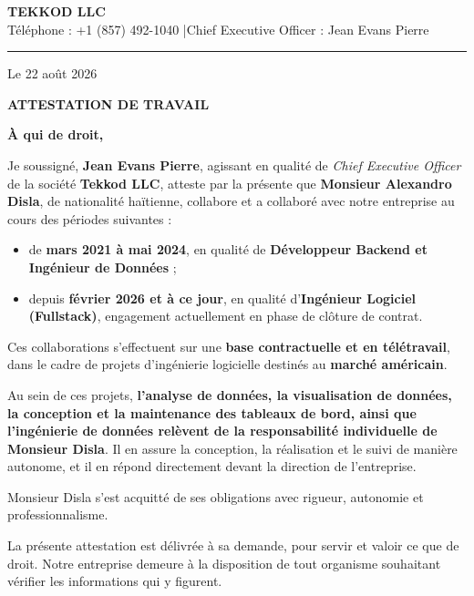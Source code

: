 \documentclass[11pt,a4paper]{article}
\begin{document}
{\Large\bfseries TEKKOD LLC}\\[3pt]
{\small Téléphone : +1 (857) 492-1040 \quad|\quad Chief Executive Officer : Jean Evans Pierre}

\vspace{14pt}
\hrule
\vspace{18pt}

\begin{flushright}
Le 22 août 2026
\end{flushright}

\begin{center}
    {\large\bfseries ATTESTATION DE TRAVAIL}
\end{center}

\vspace{10pt}

\onehalfspacing

\textbf{À qui de droit,}

Je soussigné, \textbf{Jean Evans Pierre}, agissant en qualité de \textit{Chief Executive Officer}
de la société \textbf{Tekkod LLC}, atteste par la présente que \textbf{Monsieur Alexandro Disla},
de nationalité haïtienne, collabore et a collaboré avec notre entreprise au cours des périodes
suivantes :

\begin{itemize}
    \item de \textbf{mars 2021 à mai 2024}, en qualité de \textbf{Développeur Backend et Ingénieur
    de Données} ;
    \item depuis \textbf{février 2026 et à ce jour}, en qualité d'\textbf{Ingénieur Logiciel
    (Fullstack)}, engagement actuellement en phase de clôture de contrat.
\end{itemize}

Ces collaborations s'effectuent sur une \textbf{base contractuelle et en télétravail}, dans le
cadre de projets d'ingénierie logicielle destinés au \textbf{marché américain}.

Au sein de ces projets, \textbf{l'analyse de données, la visualisation de données, la conception et
la maintenance des tableaux de bord, ainsi que l'ingénierie de données relèvent de la
responsabilité individuelle de Monsieur Disla}. Il en assure la conception, la réalisation et le
suivi de manière autonome, et il en répond directement devant la direction de l'entreprise.

Monsieur Disla s'est acquitté de ses obligations avec rigueur, autonomie et professionnalisme.

La présente attestation est délivrée à sa demande, pour servir et valoir ce que de droit. Notre
entreprise demeure à la disposition de tout organisme souhaitant vérifier les informations qui y
figurent.
\end{document}
